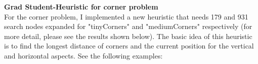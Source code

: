 \documentclass[11pt]{article}
\begin{document}
\newpage
\noindent
\textbf{Grad Student-Heuristic for corner problem}\\
For the corner problem, I implemented a new heuristic that needs 179 and 931 search nodes expanded for "tinyCorners" and "mediumCorners" respectively (for more detail, please see the results shown below). The basic idea of this heuristic is to find the longest distance of corners and the current position for the vertical and horizontal aspects. See the following examples:
\end{document}
